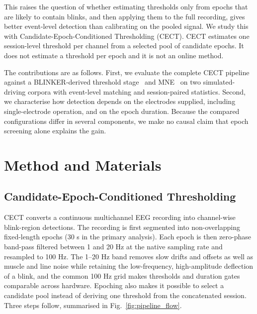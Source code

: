\documentclass[journal,twoside,web]{ieeecolor}
\begin{document}
This raises the question of whether estimating thresholds only from epochs that are likely to contain blinks, and then applying them to the full recording, gives better event-level detection than calibrating on the pooled signal. We study this with Candidate-Epoch-Conditioned Thresholding (CECT). CECT estimates one session-level threshold per channel from a selected pool of candidate epochs. It does not estimate a threshold per epoch and it is not an online method.

The contributions are as follows. First, we evaluate the complete CECT pipeline against a BLINKER-derived threshold stage~\citep{kleifges2017blinker} and MNE~\citep{GramfortEtAl2013a} on two simulated-driving corpora with event-level matching and session-paired statistics. Second, we characterise how detection depends on the electrodes supplied, including single-electrode operation, and on the epoch duration. Because the compared configurations differ in several components, we make no causal claim that epoch screening alone explains the gain.

\section{Method and Materials}\label{sec:method}

\subsection{Candidate-Epoch-Conditioned Thresholding}

CECT converts a continuous multichannel EEG recording into channel-wise blink-region detections. The recording is first segmented into non-overlapping fixed-length epochs (30 s in the primary analysis). Each epoch is then zero-phase band-pass filtered between 1 and 20 Hz at the native sampling rate and resampled to 100 Hz. The 1--20 Hz band removes slow drifts and offsets as well as muscle and line noise while retaining the low-frequency, high-amplitude deflection of a blink, and the common 100 Hz grid makes thresholds and duration gates comparable across hardware. Epoching also makes it possible to select a candidate pool instead of deriving one threshold from the concatenated session. Three steps follow, summarised in Fig.~\ref{fig:pipeline_flow}.
\end{document}
